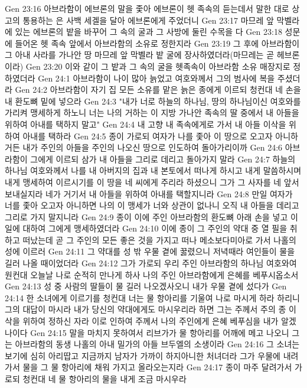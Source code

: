 Gen 23:16  아브라함이 에브론의 말을 좇아 에브론이 헷 족속의 듣는데서 말한 대로 상고의 통용하는 은 사백 세겔을 달아 에브론에게 주었더니
Gen 23:17  마므레 앞 막벨라에 있는 에브론의 밭을 바꾸어 그 속의 굴과 그 사방에 둘린 수목을 다
Gen 23:18  성문에 들어온 헷 족속 앞에서 아브라함의 소유로 정한지라
Gen 23:19  그 후에 아브라함이 그 아내 사라를 가나안 땅 마므레 앞 막벨라 밭 굴에 장사하였더라(마므레는 곧 헤브론이라)
Gen 23:20  이와 같이 그 밭과 그 속의 굴을 헷족속이 아브라함 소유 매장지로 정하였더라
Gen 24:1  아브라함이 나이 많아 늙었고 여호와께서 그의 범사에 복을 주셨더라
Gen 24:2  아브라함이 자기 집 모든 소유를 맡은 늙은 종에게 이르되 청컨대 네 손을 내 환도뼈 밑에 넣으라
Gen 24:3  "내가 너로 하늘의 하나님, 땅의 하나님이신 여호와를 가리켜 맹세하게 하노니 너는 나의 거하는 이 지방 가나안 족속의 딸 중에서 내 아들을 위하여 아내를 택하지 말고"
Gen 24:4  내 고향 내 족속에게로 가서 내 아들 이삭을 위하여 아내를 택하라
Gen 24:5  종이 가로되 여자가 나를 좇아 이 땅으로 오고자 아니하거든 내가 주인의 아들을 주인의 나오신 땅으로 인도하여 돌아가리이까
Gen 24:6  아브라함이 그에게 이르되 삼가 내 아들을 그리로 데리고 돌아가지 말라
Gen 24:7  하늘의 하나님 여호와께서 나를 내 아버지의 집과 내 본토에서 떠나게 하시고 내게 말씀하시며 내게 맹세하여 이르시기를 이 땅을 네 씨에게 주리라 하셨으니 그가 그 사자를 네 앞서 보내실지라 네가 거기서 내 아들을 위하여 아내를 택할지니라
Gen 24:8  만일 여자가 너를 좇아 오고자 아니하면 나의 이 맹세가 너와 상관이 없나니 오직 내 아들을 데리고 그리로 가지 말지니라
Gen 24:9  종이 이에 주인 아브라함의 환도뼈 아래 손을 넣고 이 일에 대하여 그에게 맹세하였더라
Gen 24:10  이에 종이 그 주인의 약대 중 열 필을 취하고 떠났는데 곧 그 주인의 모든 좋은 것을 가지고 떠나 메소보다미아로 가서 나홀의 성에 이르러
Gen 24:11  그 약대를 성 밖 우물 곁에 꿇렸으니 저녁때라 여인들이 물을 길러 나올 때이었더라
Gen 24:12  그가 가로되 우리 주인 아브라함의 하나님 여호와여 원컨대 오늘날 나로 순적히 만나게 하사 나의 주인 아브라함에게 은혜를 베푸시옵소서
Gen 24:13  성 중 사람의 딸들이 물 길러 나오겠사오니 내가 우물 곁에 섰다가
Gen 24:14  한 소녀에게 이르기를 청컨대 너는 물 항아리를 기울여 나로 마시게 하라 하리니 그의 대답이 마시라 내가 당신의 약대에게도 마시우리라 하면 그는 주께서 주의 종 이삭을 위하여 정하신 자라 이로 인하여 주께서 나의 주인에게 은혜 베푸심을 내가 알겠나이다
Gen 24:15  말을 마치지 못하여서 리브가가 물 항아리를 어깨에 메고 나오니 그는 아브라함의 동생 나홀의 아내 밀가의 아들 브두엘의 소생이라
Gen 24:16  그 소녀는 보기에 심히 아리땁고 지금까지 남자가 가까이 하지아니한 처녀더라 그가 우물에 내려가서 물을 그 물 항아리에 채워 가지고 올라오는지라
Gen 24:17  종이 마주 달려가서 가로되 청컨대 네 물 항아리의 물을 내게 조금 마시우라
